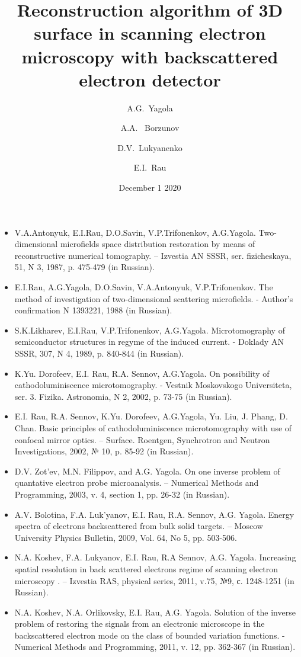 \documentclass{beamer}
\title[3D surface reconstruction in SEM BE]{Reconstruction algorithm of 3D
    surface in scanning electron microscopy with backscattered electron
    detector}
\author[A.G.~Yagola]{A.G.~Yagola \inst{1} \and A.A.~ Borzunov \inst{1}
    \and D.V.~Lukyanenko \inst{1} \and E.I.~Rau \inst{1}}
\institute[Lomonosov MSU]{\inst{1}Lomonosov Moscow State University}
\date{December 1 2020}
\begin{document}
\begin{frame}
    \titlepage
\end{frame}

\begin{frame}[c, allowframebreaks]
    \begin{itemize}
    \small
        \item V.A.Antonyuk, E.I.Rau, D.O.Savin, V.P.Trifonenkov, A.G.Yagola. Two-dimensional microfields space distribution restoration by means of reconstructive numerical tomography. – Izvestia AN SSSR, ser. fizicheskaya, 51, N 3, 1987, p. 475-479 (in Russian).
        \item E.I.Rau, A.G.Yagola, D.O.Savin, V.A.Antonyuk, V.P.Trifonenkov. The method of investigation of two-dimensional scattering microfields. - Author’s confirmation N 1393221, 1988 (in Russian).
        \item S.K.Likharev, E.I.Rau, V.P.Trifonenkov, A.G.Yagola. Microtomography of semiconductor structures in regyme of the induced current. - Doklady AN SSSR, 307, N 4, 1989, p. 840-844 (in Russian).
        \item K.Yu. Dorofeev, E.I. Rau, R.A. Sennov, A.G.Yagola. On possibility of cathodoluminiscence microtomography. - Vestnik Moskovskogo Universiteta, ser. 3. Fizika. Astronomia, N 2, 2002, p. 73-75 (in Russian).
        \item E.I. Rau, R.A. Sennov, K.Yu. Dorofeev, A.G.Yagola, Yu. Liu, J. Phang, D. Chan. Basic principles of cathodoluminiscence microtomography with use of confocal mirror optics. – Surface. Roentgen, Synchrotron and Neutron Investigations, 2002, № 10, p. 85-92 (in Russian).
        \item D.V. Zot'ev, M.N. Filippov, and A.G. Yagola. On one inverse problem of quantative electron probe microanalysis.  – Numerical Methods and Programming, 2003, v. 4, section 1, pp. 26-32 (in Russian).
        \item A.V. Bolotina, F.A. Luk’yanov, E.I. Rau, R.A. Sennov, A.G. Yagola. Energy spectra of electrons backscattered from bulk solid targets. – Moscow University Physics Bulletin, 2009, Vol. 64, No 5, pp. 503-506.
        \item N.A. Koshev, F.A. Lukyanov, E.I. Rau, R.A Sennov, A.G. Yagola. Increasing spatial resolution in back scattered electrons regime of scanning electron microscopy . – Izvestia RAS, physical series, 2011, v.75, №9, с. 1248-1251 (in Russian).
        \item N.A. Koshev, N.A. Orlikovsky, E.I. Rau, A.G. Yagola.  Solution of the inverse problem of restoring the signals from an electronic microscope in the backscattered electron mode on the class of bounded variation functions. - Numerical Methods and Programming, 2011, v. 12, pp. 362-367 (in Russian).

\end{itemize}
\end{frame}
\end{document}
